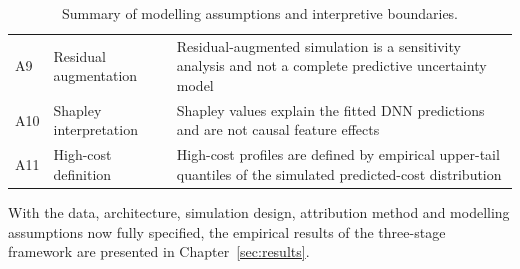 \begin{table}[H]
\begin{tabular}{p{}p{}p{}}
A9 &
Residual augmentation &
Residual-augmented simulation is a sensitivity analysis and not a complete predictive uncertainty model \\

A10 &
Shapley interpretation &
Shapley values explain the fitted DNN predictions and are not causal feature effects \\

A11 &
High-cost definition &
High-cost profiles are defined by empirical upper-tail quantiles of the simulated predicted-cost distribution \\
\bottomrule
\end{tabular}
\caption{Summary of modelling assumptions and interpretive boundaries.}
\label{tab:modelling_assumptions_ch3}
\end{table}

With the data, architecture, simulation design, attribution method and
modelling assumptions now fully specified, the empirical results of the
three-stage framework are presented in Chapter~\ref{sec:results}.


